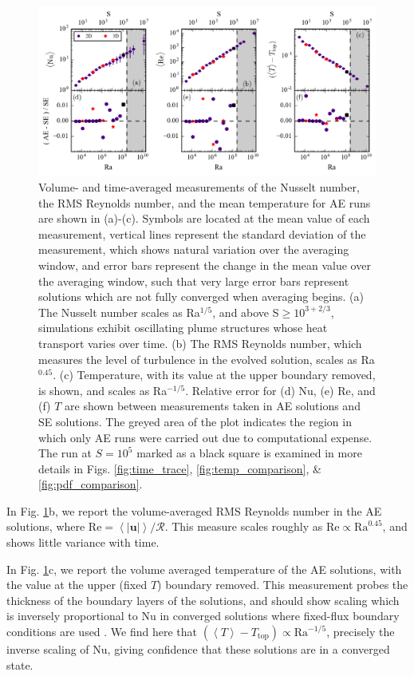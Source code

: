 \documentclass[aps, pre, onecolumn, nofootinbib, notitlepage, groupedaddress, amsfonts, amssymb, amsmath, longbibliography]{revtex4-1}
\newcommand{\angles}[1]{\ensuremath{\left\langle #1 \right\rangle}}
\begin{document}
\begin{figure}[t]
\includegraphics[width=\textwidth]{./figs/parameter_space_comparison.png}
\caption{Volume- and time-averaged measurements of the Nusselt number, the
RMS Reynolds number, and the mean temperature for AE runs are shown in (a)-(c).
Symbols are located at the mean value of
each measurement, vertical lines represent the standard deviation of the measurement,
which shows natural variation over the
averaging window, and error bars represent the change in the mean value over the averaging window,
such that very large error bars represent solutions which are not fully converged when averaging
begins.
(a) The Nusselt number scales as Ra$^{1/5}$, and above S$\geq 10^{3+2/3}$,
simulations exhibit oscillating plume structures whose heat transport varies over time.  
(b) The RMS Reynolds number, which measures the level of turbulence in the evolved solution, scales as
Ra$^{0.45}$. (c) Temperature, with its value at the upper boundary removed, is shown,
and scales as Ra$^{-1/5}$.
Relative error for (d) Nu, (e) Re, and (f) $T$ are shown between measurements 
taken in AE solutions and SE solutions.
The greyed area of the plot indicates the region in which only AE runs were
carried out due to computational expense. The run at $S = 10^5$ marked as a
black square is examined in more details in Figs. \ref{fig:time_trace},
\ref{fig:temp_comparison}, \& \ref{fig:pdf_comparison}.
\label{fig:parameter_space_comparison} }
\end{figure}



In Fig. \ref{fig:parameter_space_comparison}b, we report the volume-averaged
RMS Reynolds number in the AE solutions, where
$\text{Re} = \angles{|\bm{u}|} / \mathcal{R}$.  This measure scales roughly as
$\text{Re} \propto \text{Ra}^{0.45}$, and shows little variance with time.

In Fig. \ref{fig:parameter_space_comparison}c, we report the volume averaged 
temperature of the AE solutions, with the value at the upper (fixed $T$) boundary removed.
This measurement probes the thickness of the boundary layers of the solutions, and
should show scaling which is inversely proportional to Nu in converged solutions
where fixed-flux boundary conditions are used \cite{otero&all2002}.  We find here
that $(\angles{T} - T_{\text{top}}) \propto \text{Ra}^{-1/5}$, precisely the inverse
scaling of Nu, giving confidence that these solutions are in a converged state.
\end{document}
